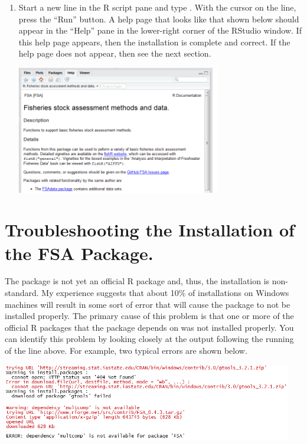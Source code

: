\documentclass{article}\usepackage[]{graphicx}\usepackage[]{color}
\begin{document}
\begin{enumerate}
  \item Start a new line in the R script pane and type .  With the cursor on the line, press the ``Run'' button.  A help page that looks like that shown below should appear in the ``Help'' pane in the lower-right corner of the RStudio window.  If this help page appears, then the installation is complete and correct.  If the help page does not appear, then see the next section.
\begin{center}
  \includegraphics[width=3.5in]{Figs/RStudio_Prep_FSAHelp.png}
\end{center}
\end{enumerate}

\section{Troubleshooting the Installation of the FSA Package.}
The  package is not yet an official R package and, thus, the installation is non-standard.  My experience suggests that about 10\% of installations on Windows machines will result in some sort of error that will cause the  package to not be installed properly.  The primary cause of this problem is that one or more of the official R packages that the  package depends on was not installed properly.  You can identify this problem by looking closely at the output following the running of the  line above.  For example, two typical errors are shown below.

\begin{center}
  \includegraphics[width=5in]{Figs/RStudio_Prep_FSAInstallErrors.png}
\end{center}
\end{document}
